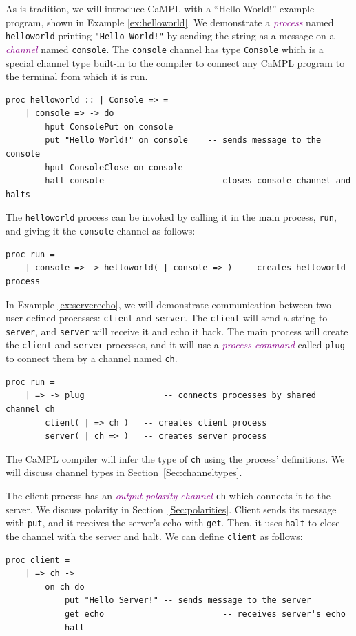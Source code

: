 \documentclass[11pt]{article}
\newcommand{\tc}[1]{\textcolor{darkMagenta}{\textit{#1}}}
\begin{document}
As is tradition, we will introduce CaMPL with a ``Hello World!'' example program, shown in Example \ref{ex:helloworld}.
We demonstrate a \tc{process} named \lstinline$helloworld$ printing \lstinline$"Hello World!"$ by sending the string as a message on a \tc{channel} named \lstinline$console$.
The \lstinline$console$ channel has type \lstinline$Console$ which is a special channel type built-in to the compiler to connect any CaMPL program to the terminal from which it is run.
\begin{lstlisting}[label=ex:helloworld, caption=Hello World!, name=helloworld] 
proc helloworld :: | Console => =
	| console => -> do
		hput ConsolePut on console
		put "Hello World!" on console    -- sends message to the console
		hput ConsoleClose on console
		halt console                     -- closes console channel and halts
\end{lstlisting}
The \lstinline$helloworld$ process can be invoked by calling it in the main process, \lstinline$run$, and giving it the \lstinline$console$ channel as follows:
\begin{lstlisting}[name=helloworld] 
proc run =
	| console => -> helloworld( | console => )  -- creates helloworld process
\end{lstlisting}

In Example \ref{ex:serverecho}, we will demonstrate communication between two user-defined processes: \lstinline$client$ and \lstinline$server$. 
The \lstinline$client$ will send a string to \lstinline$server$, and \lstinline$server$ will receive it and echo it back.
The main process will create the \lstinline$client$ and \lstinline$server$ processes, and it will use a \tc{process command} called \lstinline$plug$ to connect them by a channel named \lstinline$ch$.

\newpage
\begin{lstlisting}[label=ex:serverecho, caption=Server echos Client's message]
proc run =
	| => -> plug				-- connects processes by shared channel ch
		client( | => ch )	-- creates client process
		server( | ch => )	-- creates server process
\end{lstlisting}
The CaMPL compiler will infer the type of \lstinline$ch$ using the process' definitions. We will discuss channel types in Section~\ref{Sec:channeltypes}.

The client process has an \tc{output polarity channel} \lstinline$ch$ which connects it to the server.
We discuss polarity in Section~\ref{Sec:polarities}.
Client sends its message with \lstinline$put$, and it receives the server's echo with \lstinline$get$.
Then, it uses \lstinline$halt$ to close the channel with the server and halt.
We can define \lstinline$client$ as follows:
\begin{lstlisting}
proc client =
	| => ch ->
		on ch do
			put "Hello Server!"	-- sends message to the server
			get echo						-- receives server's echo
			halt
\end{lstlisting}
\end{document}
